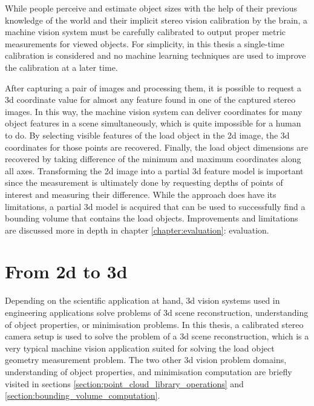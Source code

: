 \documentclass[12pt,a4paper,oneside,pdftex]{report}
\begin{document}
{While people perceive and estimate object sizes with the help of their previous knowledge of the world and their implicit stereo vision calibration by the brain, a machine vision system must be carefully calibrated to output proper metric measurements for viewed objects. For simplicity, in this thesis a single-time calibration is considered and no machine learning techniques are used to improve the calibration at a later time.

After capturing a pair of images and processing them, it is possible to request a 3d coordinate value for almost any feature found in one of the captured stereo images. In this way, the machine vision system can deliver coordinates for many object features in a scene simultaneously, which is quite impossible for a human to do. By selecting visible features of the load object in the 2d image, the 3d coordinates for those points are recovered. Finally, the load object dimensions are recovered by taking difference of the minimum and maximum coordinates along all axes. Transforming the 2d image into a partial 3d feature model is important since the measurement is ultimately done by requesting depths of points of interest and measuring their difference. While the approach does have its limitations, a partial 3d model is acquired that can be used to successfully find a bounding volume that contains the load objects. Improvements and limitations are discussed more in depth in chapter \ref{chapter:evaluation}: evaluation.

\section{From 2d to 3d}
\label{section:from_2d_to_3d}

Depending on the scientific application at hand, 3d vision systems used in engineering applications solve problems of 3d scene reconstruction, understanding of object properties, or minimisation problems. In this thesis, a calibrated stereo camera setup is used to solve the problem of a 3d scene reconstruction, which is a very typical machine vision application suited for solving the load object geometry measurement problem. The two other 3d vision problem domains, understanding of object properties, and minimisation computation are briefly visited in sections \ref{section:point_cloud_library_operations} and \ref{section:bounding_volume_computation}. \citep{Sonka07}

}
\end{document}
